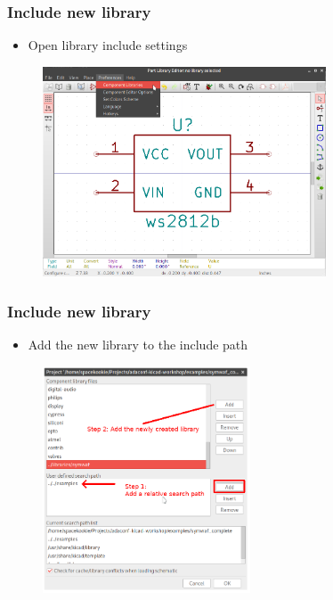 \documentclass{beamer}
\begin{document}
\begin{frame}
  \frametitle{Include new library}
  \begin{itemize}
    \item Open library include settings
  \end{itemize}
  \begin{figure}[H]
    \centering
    \includegraphics[width=0.75\textwidth]{images/step_04.png}
  \end{figure}
\end{frame}


\begin{frame}
  \frametitle{Include new library}
  \begin{itemize}
    \item Add the new library to the include path
  \end{itemize}
  \begin{figure}[H]
    \centering
    \includegraphics[width=0.55\textwidth]{images/step_05.png}
  \end{figure}
\end{frame}
\end{document}
